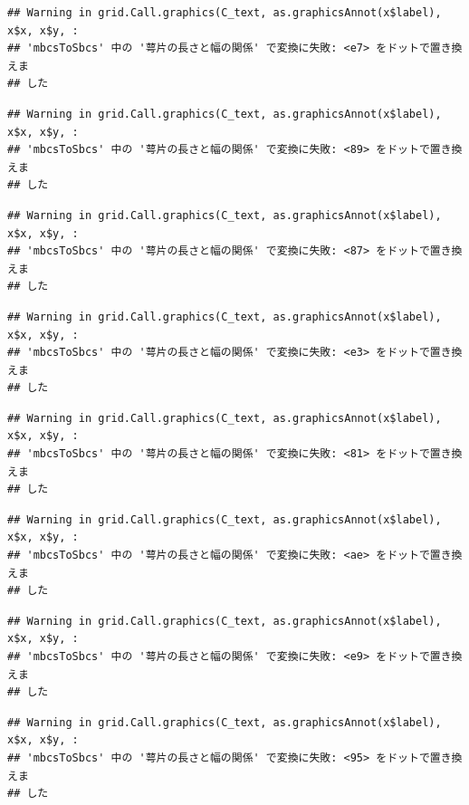 \documentclass[
]{book}
\begin{document}
\begin{verbatim}
## Warning in grid.Call.graphics(C_text, as.graphicsAnnot(x$label), x$x, x$y, :
## 'mbcsToSbcs' 中の '萼片の長さと幅の関係' で変換に失敗: <e7> をドットで置き換えま
## した
\end{verbatim}

\begin{verbatim}
## Warning in grid.Call.graphics(C_text, as.graphicsAnnot(x$label), x$x, x$y, :
## 'mbcsToSbcs' 中の '萼片の長さと幅の関係' で変換に失敗: <89> をドットで置き換えま
## した
\end{verbatim}

\begin{verbatim}
## Warning in grid.Call.graphics(C_text, as.graphicsAnnot(x$label), x$x, x$y, :
## 'mbcsToSbcs' 中の '萼片の長さと幅の関係' で変換に失敗: <87> をドットで置き換えま
## した
\end{verbatim}

\begin{verbatim}
## Warning in grid.Call.graphics(C_text, as.graphicsAnnot(x$label), x$x, x$y, :
## 'mbcsToSbcs' 中の '萼片の長さと幅の関係' で変換に失敗: <e3> をドットで置き換えま
## した
\end{verbatim}

\begin{verbatim}
## Warning in grid.Call.graphics(C_text, as.graphicsAnnot(x$label), x$x, x$y, :
## 'mbcsToSbcs' 中の '萼片の長さと幅の関係' で変換に失敗: <81> をドットで置き換えま
## した
\end{verbatim}

\begin{verbatim}
## Warning in grid.Call.graphics(C_text, as.graphicsAnnot(x$label), x$x, x$y, :
## 'mbcsToSbcs' 中の '萼片の長さと幅の関係' で変換に失敗: <ae> をドットで置き換えま
## した
\end{verbatim}

\begin{verbatim}
## Warning in grid.Call.graphics(C_text, as.graphicsAnnot(x$label), x$x, x$y, :
## 'mbcsToSbcs' 中の '萼片の長さと幅の関係' で変換に失敗: <e9> をドットで置き換えま
## した
\end{verbatim}

\begin{verbatim}
## Warning in grid.Call.graphics(C_text, as.graphicsAnnot(x$label), x$x, x$y, :
## 'mbcsToSbcs' 中の '萼片の長さと幅の関係' で変換に失敗: <95> をドットで置き換えま
## した
\end{verbatim}
\end{document}
